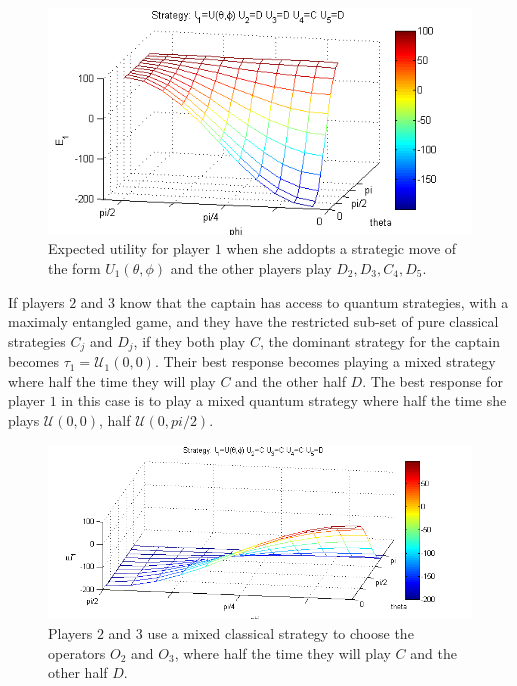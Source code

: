 \begin{figure}[h]
\centering 
\includegraphics[scale=0.80]{Figures/1.5qubit/meanpirate.png}
\caption{Expected utility for player $1$ when she addopts a strategic move of the form $U_{1}(\theta,\phi)$ and the other players play $D_{2},D_{3},C_{4},D_{5}$. }
\label{fig:pg_3players_99_0_1:4}
\end{figure}

If players $2$ and $3$ know that the captain has access to quantum strategies, with a maximaly entangled game, and they have the restricted sub-set of pure classical strategies $C_{j}$ and $D_{j}$, if they both play $C$, the dominant strategy for the captain becomes $\tau_{1} = \mathcal{U}_{1}(0,0)$. Their best response becomes playing a mixed strategy where half the time they will play $C$ and the other half $D$. The best response for player $1$ in this case is to play a mixed quantum strategy where half the time she plays $\mathcal{U}(0,0)$, half $\mathcal{U}(0,pi/2)$.



\begin{figure}[h]
\centering 
\includegraphics[scale=0.80]{Figures/1.5qubit/meanpirategetscrewed.png}
\caption{Players $2$ and $3$ use a mixed classical strategy to choose the operators $O_{2}$ and $O_{3}$, where half the time they will play $C$ and the other half $D$. }
\label{fig:pg_3players_99_0_1:2}
\end{figure}

